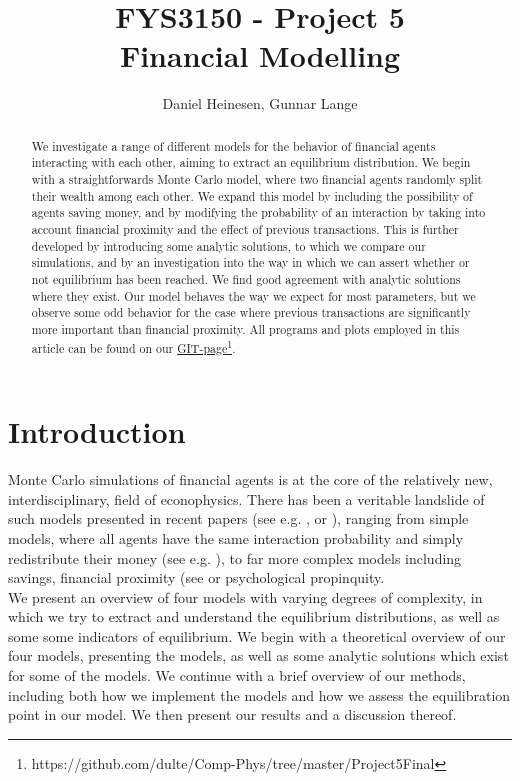 \documentclass[a4paper, 10pt]{article}
\title{FYS3150 - Project 5\\
Financial Modelling}
\author{Daniel Heinesen, Gunnar Lange}
\begin{document}
\maketitle
\begin{abstract}
We investigate a range of different models for the behavior of financial agents interacting with each other, aiming to extract an equilibrium distribution. We begin with a straightforwards Monte Carlo model, where two financial agents randomly split their wealth among each other. We expand this model by including the possibility of agents saving money, and by modifying the probability of an interaction by taking into account financial proximity and the effect of previous transactions. This is further developed by introducing some analytic solutions, to which we compare our simulations, and by an investigation into the way in which we can assert whether or not equilibrium has been reached. We find good agreement with analytic solutions where they exist. Our model behaves the way we expect for most parameters, but we observe some odd behavior for the case where previous transactions are significantly more important than financial proximity. All programs and plots employed in this article can be found on our \href{https://github.com/dulte/Comp-Phys/tree/master/Project5Final}{GIT-page}\footnote{https://github.com/dulte/Comp-Phys/tree/master/Project5Final}.
\end{abstract}
\tableofcontents
\section{Introduction}
Monte Carlo simulations of financial agents is at the core of the relatively new, interdisciplinary, field of econophysics. There has been a veritable landslide of such models presented in recent papers (see e.g. \cite{Self-adjusted}, \cite{Finite-size} or \cite{AgentBased}), ranging from simple models, where all agents have the same interaction probability and simply redistribute their money (see e.g. \cite{Gibbs}), to far more complex models including savings, financial proximity (see \cite{AgentBased} or psychological propinquity.\\
\linebreak
We present an overview of four models with varying degrees of complexity, in which we try to extract and understand the equilibrium distributions, as well as some some indicators of equilibrium. We begin with a theoretical overview of our four models, presenting the models, as well as some analytic solutions which exist for some of the models. We continue with a brief overview of our methods, including both how we implement the models and how we assess the equilibration point in our model. We then present our results and a discussion thereof.
\end{document}

